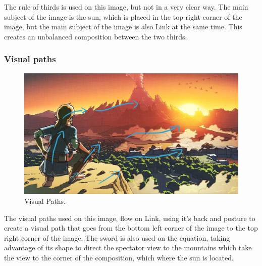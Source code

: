 \documentclass{cup-pan}
\begin{document}
                The rule of thirds is used on this image, but not in a very clear way. 
                The main subject of the image is the sun, which is placed in the top right corner of the image, but the main subject of the image is also Link at the same time.
                This creates an unbalanced composition between the two thirds.\\

            \subsubsection{Visual paths} \label{visualpaths}
                \begin{figure}[H]
                    \includegraphics[width=\textwidth]{Imagenes/Referencias/Analisis_ConceptArt/recorridovisual.png}
                    \caption{Visual Paths.}
                \end{figure}

                The visual paths used on this image, flow on Link, using it's back and posture to create a visual path that goes from the bottom left corner of the image to the top right corner of the image.
                The sword is also used on the equation, taking advantage of its shape to direct the spectator view to the mountains which take the view to the corner of the composition, which where the sun is located. \\
\end{document}
